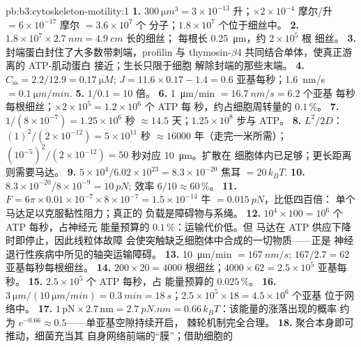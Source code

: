 \begin{solution}{pb:b3:cytoskeleton-motility:1}
\textbf{1.} $\qty{300}{\micro m^3} = 3\times 10^{-13}$ 升；$\times
2\times 10^{-4}$ 摩尔/升 $= 6\times 10^{-17}$ 摩尔 $= 3.6\times 10^{7}$ 个
分子；$1.8\times 10^{7}$ 个位于细丝中。
\textbf{2.} $1.8\times 10^{7}\times \qty{2.7}{nm} = \qty{4.9}{cm}$ 长的细丝；
每根长 \qty{0.25}{\micro m}，约 $2\times 10^{5}$ 根
细丝。
\textbf{3.} 封端蛋白封住了大多数带刺端，profilin 与 thymosin-$\beta$4
共同结合单体，使真正游离的 ATP-肌动蛋白
接近；生长只限于细胞
解除封端的那些末端。
\textbf{4.} $C_{\text{ss}} = 2.2/12.9 = \qty{0.17}{\micro M}$; $J = 11.6
\times 0.17 - 1.4 = 0.6$ 亚基每秒；\qty{1.6}{nm/s} $=
\qty{0.1}{\micro m/min}$.
\textbf{5.} $1/0.1 = 10$ 倍。
\textbf{6.} \qty{1}{\micro m/min} $= \qty{16.7}{nm/s} = 6.2$ 个亚基
每秒每根细丝；$\times 2\times 10^{5} = 1.2\times 10^{6}$ 个 ATP 每
秒，约占细胞周转量的 $0.1\,\%$。
\textbf{7.} $1/(8\times 10^{-7}) = 1.25\times 10^{6}$ 秒 $\approx 14.5$
天；$1.25\times 10^{8}$ 步与 ATP。
\textbf{8.} $L^{2}/2D$：$(1)^{2}/(2\times 10^{-12}) = 5\times 10^{11}$ 秒
$\approx \num{16000}$ 年（走完一米所需）；$(10^{-5})^{2}/(2\times
10^{-12}) = 50$ 秒对应 \qty{10}{\micro m}。扩散在
细胞体内已足够；更长距离则需要马达。
\textbf{9.} $5\times 10^{4}/6.02\times 10^{23} = 8.3\times 10^{-20}$ 焦耳
$= 20\,k_{B}T$.
\textbf{10.} $8.3\times 10^{-20}/8\times 10^{-9} = \qty{10}{pN}$;
效率 $6/10 \approx 60\,\%$。
\textbf{11.} $F = 6\pi\times 0.01\times 10^{-7}\times 8\times 10^{-7} =
1.5\times 10^{-14}$ 牛 $= \qty{0.015}{pN}$，比低四百倍：
单个马达足以克服黏性阻力；真正的
负载是障碍物与系绳。
\textbf{12.} $10^{4}\times 100 = 10^{6}$ 个 ATP 每秒，占神经元
能量预算的 $0.1\,\%$：运输代价低。但
马达在 ATP 供应下降时即停止，因此线粒体故障
会使突触缺乏细胞体中合成的一切物质——正是
神经退行性疾病中所见的轴突运输障碍。
\textbf{13.} \qty{10}{\micro m/min} $= \qty{167}{nm/s}$; $167/2.7 = 62$
亚基每秒每根细丝。
\textbf{14.} $200\times 20 = 4000$ 根细丝；$4000\times 62 = 2.5\times
10^{5}$ 亚基每秒。
\textbf{15.} $2.5\times 10^{5}$ 个 ATP 每秒，占
能量预算的 $0.025\,\%$。
\textbf{16.} $\qty{3}{\micro m}/(\qty{10}{\micro m/min}) = \qty{0.3}{min}
= \qty{18}{s}$；$2.5\times 10^{5}\times 18 = 4.5\times 10^{6}$ 个亚基
位于网络中。
\textbf{17.} $1\,\text{pN}\times 2.7\,\text{nm} = \qty{2.7}{pN.nm} =
0.66\,k_{B}T$：该能量的涨落出现的概率
约为 $e^{-0.66} \approx 0.5$——单亚基空隙持续开启，
棘轮机制完全合理。
\textbf{18.} 聚合本身即可推动，细菌充当其
自身网络前端的“膜”；借助细胞的

\end{solution}

